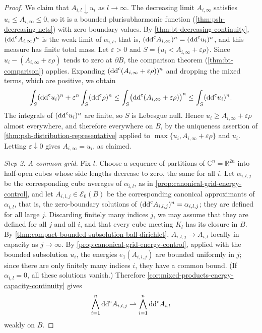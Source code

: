 \begin{proof}
We claim that $A_{i,l}\downarrow u_i$ as $l\to\infty$. The decreasing limit $A_{i,\infty}$ satisfies $u_i\leq A_{i,\infty}\leq0$, so it is a bounded plurisubharmonic function (\cref{thm:psh-decreasing-nets}) with zero boundary values. By \cref{thm:bt-decreasing-continuity}, $(\mathrm{dd}^{\mathrm{c}} A_{i,\infty})^n$ is the weak limit of $\alpha_{i,l}$, that is, $(\mathrm{dd}^{\mathrm{c}} A_{i,\infty})^n=(\mathrm{dd}^{\mathrm{c}} u_i)^n$, and this measure has finite total mass. Let $\varepsilon>0$ and $S=\{u_i<A_{i,\infty}+\varepsilon\rho\}$. Since $u_i-(A_{i,\infty}+\varepsilon\rho)$ tends to zero at $\partial B$, the comparison theorem (\cref{thm:bt-comparison}) applies. Expanding $(\mathrm{dd}^{\mathrm{c}}(A_{i,\infty}+\varepsilon\rho))^n$ and dropping the mixed terms, which are positive, we obtain
\[
 \int_S(\mathrm{dd}^{\mathrm{c}} u_i)^n+\varepsilon^n\int_S(\mathrm{dd}^{\mathrm{c}}\rho)^n
 \leq\int_S\bigl(\mathrm{dd}^{\mathrm{c}}(A_{i,\infty}+\varepsilon\rho)\bigr)^n
 \leq\int_S(\mathrm{dd}^{\mathrm{c}} u_i)^n.
\]
The integrals of $(\mathrm{dd}^{\mathrm{c}} u_i)^n$ are finite, so $S$ is Lebesgue null. Hence $u_i\geq A_{i,\infty}+\varepsilon\rho$ almost everywhere, and therefore everywhere on $B$, by the uniqueness assertion of \cref{thm:psh-distribution-representative} applied to $\max\{u_i,A_{i,\infty}+\varepsilon\rho\}$ and $u_i$. Letting $\varepsilon\downarrow0$ gives $A_{i,\infty}=u_i$, as claimed.

\emph{Step 2. A common grid.}
Fix $l$. Choose a sequence of partitions of $\mathbb C^n=\mathbb R^{2n}$ into half-open cubes whose side lengths decrease to zero, the same for all $i$. Let $\alpha_{i,l,j}$ be the corresponding cube averages of $\alpha_{i,l}$, as in \cref{prop:canonical-grid-energy-control}, and let $A_{i,l,j}\in\mathcal E_0(B)$ be the corresponding canonical approximants of $\alpha_{i,l}$, that is, the zero-boundary solutions of $(\mathrm{dd}^{\mathrm{c}} A_{i,l,j})^n=\alpha_{i,l,j}$; they are defined for all large $j$. Discarding finitely many indices $j$, we may assume that they are defined for all $j$ and all $i$, and that every cube meeting $K_l$ has its closure in $B$. By \cref{thm:compact-bounded-subsolution-ball-dirichlet}, $A_{i,l,j}\to A_{i,l}$ locally in capacity as $j\to\infty$. By \cref{prop:canonical-grid-energy-control}, applied with the bounded subsolution $u_i$, the energies $e_1(A_{i,l,j})$ are bounded uniformly in $j$; since there are only finitely many indices $i$, they have a common bound. (If $\alpha_{i,l}=0$, all these solutions vanish.) Therefore \cref{cor:mixed-products-energy-capacity-continuity} gives
\begin{equation}\label{eq:common-measure-grid-mixed-limit}
 \bigwedge_{i=1}^n\mathrm{dd}^{\mathrm{c}} A_{i,l,j}
                      \rightharpoonup\bigwedge_{i=1}^n\mathrm{dd}^{\mathrm{c}} A_{i,l}
\end{equation}
weakly on $B$.


\end{proof}
